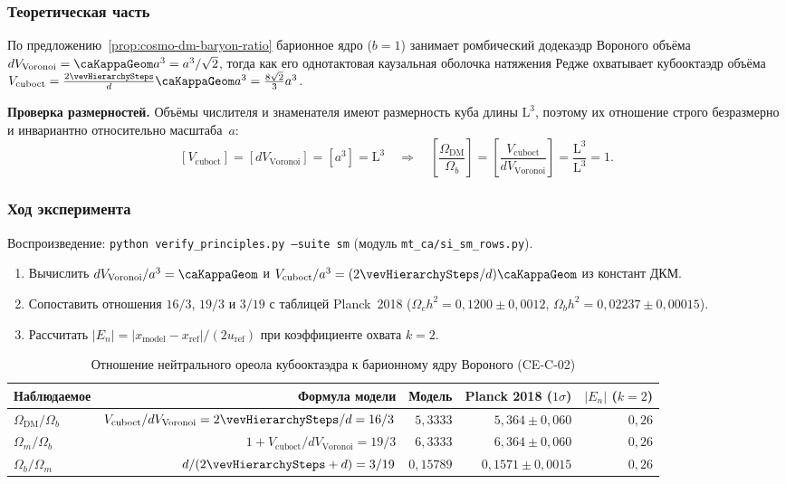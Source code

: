 \subsubsection*{Теоретическая часть}
По предложению~\ref{prop:cosmo-dm-baryon-ratio} барионное ядро ($b=1$) занимает ромбический додекаэдр Вороного объёма $dV_{\mathrm{Voronoi}} = \caKappaGeom a^3 = a^3/\sqrt{2}$, тогда как его однотактовая каузальная оболочка натяжения Редже охватывает кубооктаэдр объёма $V_{\mathrm{cuboct}} = \frac{2\vevHierarchySteps}{d}\caKappaGeom a^3 = \frac{8\sqrt{2}}{3}a^3$.

\textbf{Проверка размерностей.}
Объёмы числителя и знаменателя имеют размерность куба длины $\mathrm{L}^3$, поэтому их отношение строго безразмерно и инвариантно относительно масштаба~$a$:
\[
  [V_{\mathrm{cuboct}}] = [dV_{\mathrm{Voronoi}}] = [a^3] = \mathrm{L^3}
  \quad\Longrightarrow\quad
  \left[\frac{\Omega_{\mathrm{DM}}}{\Omega_b}\right] = \left[\frac{V_{\mathrm{cuboct}}}{dV_{\mathrm{Voronoi}}}\right] = \frac{\mathrm{L^3}}{\mathrm{L^3}} = 1.
\]

\subsubsection*{Ход эксперимента}
Воспроизведение: \texttt{python verify\_principles.py --suite sm} (модуль \texttt{mt\_ca/si\_sm\_rows.py}).

\begin{enumerate}[label=\textbf{Шаг \arabic*:},leftmargin=*,itemsep=0.35em]
\item Вычислить $dV_{\mathrm{Voronoi}}/a^3 = \caKappaGeom$ и $V_{\mathrm{cuboct}}/a^3 = (2\vevHierarchySteps/d)\caKappaGeom$ из констант ДКМ.
\item Сопоставить отношения $16/3$, $19/3$ и $3/19$ с таблицей Planck~2018 ($\Omega_c h^2 = 0{,}1200\pm 0{,}0012$, $\Omega_b h^2 = 0{,}02237\pm 0{,}00015$).
\item Рассчитать $|E_n| = |x_{\mathrm{model}} - x_{\mathrm{ref}}| / (2 u_{\mathrm{ref}})$ при коэффициенте охвата $k=2$.
\end{enumerate}

\begin{table}[htbp]
\centering
\footnotesize
\setlength{\tabcolsep}{4pt}
\caption{Отношение нейтрального ореола кубооктаэдра к барионному ядру Вороного (CE-C-02)}
\label{tab:exp-ce-c-02}
\begin{tabular}{@{}lrrrr@{}}
\toprule
Наблюдаемое & Формула модели & Модель & Planck 2018 ($1\sigma$) & $|E_n|$ ($k=2$) \\
\midrule
$\Omega_{\mathrm{DM}}/\Omega_b$ & $V_{\mathrm{cuboct}}/dV_{\mathrm{Voronoi}} = 2\vevHierarchySteps/d = 16/3$ & $5{,}3333$ & $5{,}364 \pm 0{,}060$ & $0{,}26$ \\
$\Omega_m/\Omega_b$ & $1 + V_{\mathrm{cuboct}}/dV_{\mathrm{Voronoi}} = 19/3$ & $6{,}3333$ & $6{,}364 \pm 0{,}060$ & $0{,}26$ \\
$\Omega_b/\Omega_m$ & $d/(2\vevHierarchySteps + d) = 3/19$ & $0{,}15789$ & $0{,}1571 \pm 0{,}0015$ & $0{,}26$ \\
\bottomrule
\end{tabular}
\end{table}

